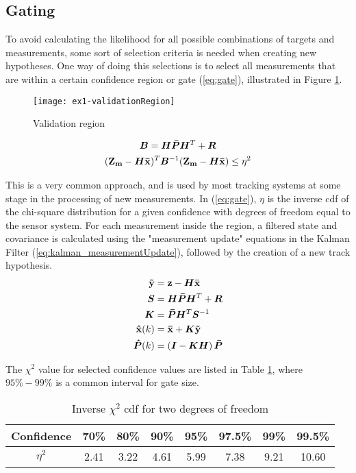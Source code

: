 \subsection{Gating}
To avoid calculating the likelihood for all possible combinations of targets and measurements, some sort of selection criteria is needed when creating new hypotheses. One way of doing this selections is to select all measurements that are within a certain confidence region or gate (\ref{eq:gate}), illustrated in Figure \ref{fig:validation_region}.
\begin{figure}[H]
\centering
\texttt{[image: ex1-validationRegion]}
\caption{Validation region}
\label{fig:validation_region}
\end{figure}
\begin{equation}
\begin{gathered}
\bm{B}	= \bm{H} \bm{\bar{P}} \bm{H}^T + \bm{R} \\
(\boldsymbol{\mathbf{Z_m}} - \bm{H}\boldsymbol{\mathbf{\bar{x}}})^T	\bm{B}^{-1} (\boldsymbol{\mathbf{Z_m}} - \bm{H}\boldsymbol{\mathbf{\bar{x}}}) \leq \eta^2
\label{eq:gate}
\end{gathered}
\end{equation}

This is a very common approach, and is used by most tracking systems at some stage in the processing of new measurements. In (\ref{eq:gate}), $\eta$ is the inverse \gls{cdf} of the chi-square distribution for a given confidence with degrees of freedom equal to the sensor system. For each measurement inside the region, a filtered state and covariance is calculated using the "measurement update" equations in the Kalman Filter (\ref{eq:kalman_measurementUpdate}), followed by the creation of a new track hypothesis.
\begin{equation}
\begin{split}
\boldsymbol{\mathbf{\tilde{y}}}	&= \boldsymbol{\mathbf{z}} - \bm{H} \boldsymbol{\mathbf{\bar{x}}} \\
\bm{S}			&= \bm{H} \bm{\bar{P}} \bm{H}^T + \bm{R} \\
\bm{K} 			&= \bm{\bar{P}} \bm{H}^T \bm{S}^{-1} \\
\boldsymbol{\mathbf{\hat{x}}}(k) 	&= \boldsymbol{\mathbf{\bar{x}}} + \bm{K} \boldsymbol{\mathbf{\tilde{y}}} \\
\bm{\hat{P}}(k) 	&= \left( \bm{I} - \bm{K} \bm{H} \right) \bm{\bar{P}}
\end{split}
\label{eq:kalman_measurementUpdate}
\end{equation}

The $\chi^2$ value for selected confidence values are listed in Table \ref{tab:chi_square}, where $95\% - 99\%$ is a common interval for gate size. 
\begin{table}[H]
\centering
\begin{tabular}{c c c c c c c c}
Confidence 	& 70\% 	& 80\% 	& 90\% 	& 95\% 	& 97.5\% 	& 99\% 	& 99.5\% \\ \hline
$\eta^2$ 	& 2.41 	& 3.22 	& 4.61 	& 5.99 	& 7.38 		& 9.21 	& 10.60
\end{tabular}
\caption{Inverse $\chi^2$ \gls{cdf} for two degrees of freedom}
\label{tab:chi_square}
\end{table}

